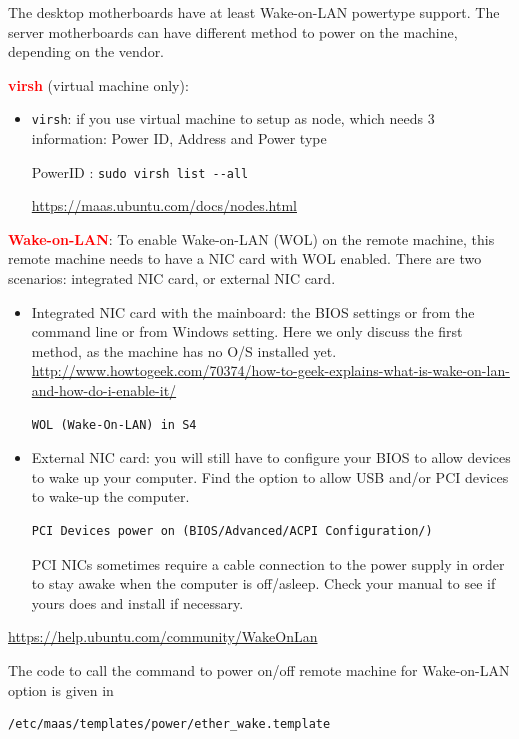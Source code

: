 The desktop motherboards have at least Wake-on-LAN powertype support. The server
motherboards can have different method to power on the machine, depending on the
vendor. 

\textcolor{red}{\bf virsh} (virtual machine only):
  \begin{itemize}
    \item \verb!virsh!: if you use virtual machine to setup as node, which needs
    3 information: Power ID, Address and Power type
    
    PowerID : \verb!sudo virsh list --all!
    
  \url{https://maas.ubuntu.com/docs/nodes.html} 
  \end{itemize}

\textcolor{red}{\bf Wake-on-LAN}: To enable Wake-on-LAN (WOL) on the remote
machine, this remote machine needs to have a NIC card with WOL enabled. There
are two scenarios: integrated NIC card, or external NIC card.
\begin{itemize}
  \item Integrated NIC card with the mainboard: 
the BIOS settings or from the command line or from
Windows setting. Here we only discuss the first method, as the machine has no
O/S installed yet.
\url{http://www.howtogeek.com/70374/how-to-geek-explains-what-is-wake-on-lan-and-how-do-i-enable-it/}
\begin{verbatim}
WOL (Wake-On-LAN) in S4
\end{verbatim}

  \item External NIC card: you will still have to configure your BIOS to allow
  devices to wake up your computer. Find the option to allow USB and/or PCI devices to wake-up the computer.
\begin{verbatim}
PCI Devices power on (BIOS/Advanced/ACPI Configuration/)
\end{verbatim}

PCI NICs sometimes require a cable connection to the power supply in order to
stay awake when the computer is off/asleep. Check your manual to see if yours
does and install if necessary.
\end{itemize}
\url{https://help.ubuntu.com/community/WakeOnLan}

The code to call the command to power on/off remote machine for Wake-on-LAN
option is given in 
\begin{verbatim}
/etc/maas/templates/power/ether_wake.template
\end{verbatim}

